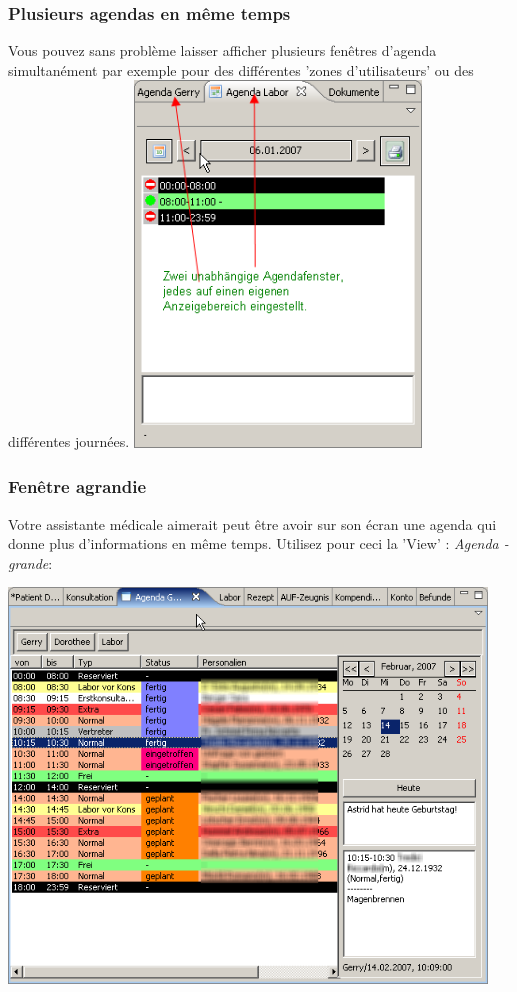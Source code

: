 \subsubsection{Plusieurs agendas en même temps}
Vous pouvez sans problème laisser afficher plusieurs fenêtres d'agenda simultanément par exemple pour des différentes 'zones d'utilisateurs' ou des différentes journées.
\includegraphics[width=3in]{images/agendamulti.png}

\subsubsection{Fenêtre agrandie}

Votre assistante médicale aimerait peut être avoir sur son écran une agenda qui donne plus d'informations en même temps. Utilisez pour ceci la 'View' :  \textit{Agenda - grande}:

\includegraphics[width=5in]{images/agenda2.png}


